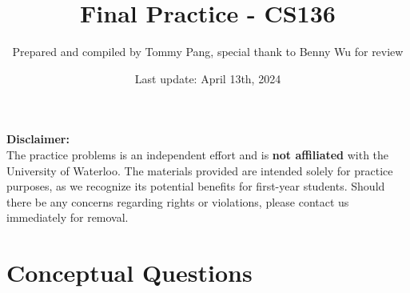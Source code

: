 \documentclass{article}
\begin{document}
\title{Final Practice - CS136}
\author{Prepared and compiled by Tommy Pang, special thank to Benny Wu for review }
\date{Last update: April 13th, 2024}

\maketitle



\noindent
\textbf{Disclaimer:} \\
\noindent
The practice problems is an independent effort and is \textbf{not affiliated} with the University of Waterloo. The materials provided are intended solely for practice purposes, as we recognize its potential benefits for first-year students. Should there be any concerns regarding rights or violations, please contact us immediately for removal.

\vspace{10pt}

\section*{Conceptual Questions}
\end{document}
